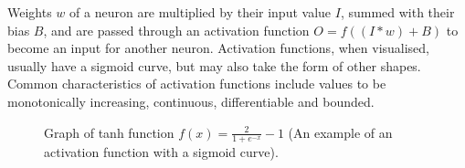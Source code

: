 \documentclass[12pt,a4paper]{article}
\begin{document}
        Weights $w$ of a neuron are multiplied by their input value $I$, summed with their bias $B$, and are passed through an activation function $O = f((I* w) + B)$ to become an input for another neuron. Activation functions, when visualised, usually have a sigmoid curve, but may also take the form of other shapes. Common characteristics of activation functions include values to be monotonically increasing, continuous, differentiable and bounded.

        \begin{figure}
            \centering
            \caption{Graph of tanh function $f(x)={\frac{2}{1+e^{-x}}- 1}$ (An example of an activation function with a sigmoid curve). \label{sigmoid}}
            \vspace{-10pt}
            \end{figure}
\end{document}
